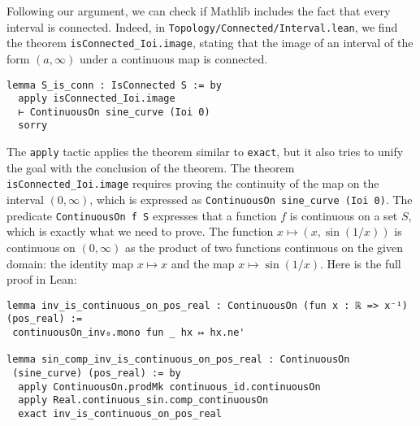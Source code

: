 Following our argument, we can check if Mathlib includes the fact that every interval
is connected.
Indeed, in \texttt{Topology/Connected/Interval.lean}, we find the theorem
\lstinline[language=lean]|isConnected_Ioi.image|, stating that the image of an
interval of the form $(a, \infty)$
under a continuous map is connected.

\begin{lstlisting}[language=lean]
lemma S_is_conn : IsConnected S := by
  apply isConnected_Ioi.image
  ⊢ ContinuousOn sine_curve (Ioi 0) 
  sorry
\end{lstlisting}
The \lstinline[language=lean]|apply| tactic applies the theorem similar to \lstinline[language=lean]|exact|, but it also tries
to unify the goal with the conclusion of the theorem.
The theorem \lstinline[language=lean]|isConnected_Ioi.image| requires proving the continuity of the map
on the interval $(0, \infty)$, which is expressed as
\lstinline[language=lean]|ContinuousOn sine_curve (Ioi 0)|.
The predicate \lstinline[language=lean]|ContinuousOn f S|
expresses that a function $f$ is continuous on a set $S$, which is exactly what we need to prove.
The function $x \mapsto (x, \sin(1/x))$ is continuous on $(0, \infty)$ as the
product of two functions continuous on the given domain: the identity map $x \mapsto x$
and the map $x \mapsto \sin(1/x)$.
Here is the full proof in Lean:
\begin{lstlisting}[language=lean]
lemma inv_is_continuous_on_pos_real : ContinuousOn (fun x : ℝ => x⁻¹) (pos_real) :=
 continuousOn_inv₀.mono fun _ hx ↦ hx.ne'

lemma sin_comp_inv_is_continuous_on_pos_real : ContinuousOn
 (sine_curve) (pos_real) := by
  apply ContinuousOn.prodMk continuous_id.continuousOn
  apply Real.continuous_sin.comp_continuousOn
  exact inv_is_continuous_on_pos_real
\end{lstlisting}
